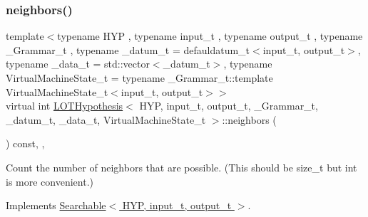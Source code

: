 \mbox{\label{class_l_o_t_hypothesis_a097cde606ec3f277fdeb92145599027f}} 
\subsubsection{\texorpdfstring{neighbors()}{neighbors()}}
{\footnotesize\ttfamily template$<$typename H\+YP , typename input\+\_\+t , typename output\+\_\+t , typename \+\_\+\+Grammar\+\_\+t , typename \+\_\+datum\+\_\+t  = defauldatum\+\_\+t$<$input\+\_\+t, output\+\_\+t$>$, typename \+\_\+data\+\_\+t  = std\+::vector$<$\+\_\+datum\+\_\+t$>$, typename Virtual\+Machine\+State\+\_\+t  = typename \+\_\+\+Grammar\+\_\+t\+::template Virtual\+Machine\+State\+\_\+t$<$input\+\_\+t, output\+\_\+t$>$$>$ \\
virtual int \hyperlink{class_l_o_t_hypothesis}{L\+O\+T\+Hypothesis}$<$ H\+YP, input\+\_\+t, output\+\_\+t, \+\_\+\+Grammar\+\_\+t, \+\_\+datum\+\_\+t, \+\_\+data\+\_\+t, Virtual\+Machine\+State\+\_\+t $>$\+::neighbors (\begin{DoxyParamCaption}{ }\end{DoxyParamCaption}) const\hspace{0.3cm}{\ttfamily [inline]}, {\ttfamily [override]}, {\ttfamily [virtual]}}



Count the number of neighbors that are possible. (This should be size\+\_\+t but int is more convenient.) 



Implements \hyperlink{class_searchable_aec30063fcc9bed5d005f8318efa8492d}{Searchable$<$ H\+Y\+P, input\+\_\+t, output\+\_\+t $>$}.

\mbox{\label{class_l_o_t_hypothesis_a7275626861140284ee08512fd0641ce1}} 

